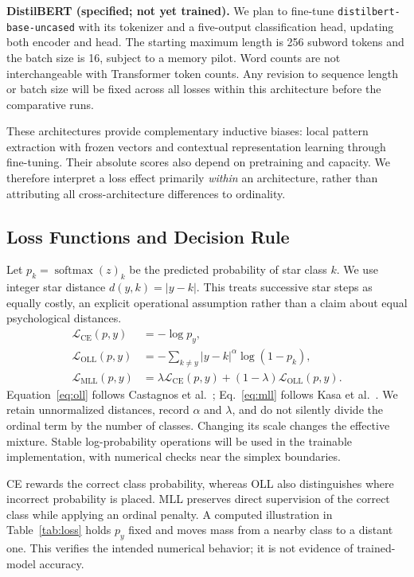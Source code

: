 \documentclass[conference]{IEEEtran}
\newcommand{\CE}{\mathcal{L}_{\mathrm{CE}}}
\newcommand{\OLL}{\mathcal{L}_{\mathrm{OLL}}}
\newcommand{\MLL}{\mathcal{L}_{\mathrm{MLL}}}
\begin{document}
\textbf{DistilBERT (specified; not yet trained).} We plan to fine-tune \texttt{distilbert-base-uncased} with its tokenizer and a five-output classification head, updating both encoder and head. The starting maximum length is 256 subword tokens and the batch size is 16, subject to a memory pilot. Word counts are not interchangeable with Transformer token counts. Any revision to sequence length or batch size will be fixed across all losses within this architecture before the comparative runs.

These architectures provide complementary inductive biases: local pattern extraction with frozen vectors and contextual representation learning through fine-tuning. Their absolute scores also depend on pretraining and capacity. We therefore interpret a loss effect primarily \emph{within} an architecture, rather than attributing all cross-architecture differences to ordinality.

\subsection{Loss Functions and Decision Rule}
Let $p_k=\operatorname{softmax}(z)_k$ be the predicted probability of star class $k$. We use integer star distance $d(y,k)=|y-k|$. This treats successive star steps as equally costly, an explicit operational assumption rather than a claim about equal psychological distances.
\begin{align}
\CE(p,y)&=-\log p_y,\label{eq:ce}\\
\OLL(p,y)&=-\sum_{k\ne y}|y-k|^{\alpha}\log(1-p_k),\label{eq:oll}\\
\MLL(p,y)&=\lambda\CE(p,y)+(1-\lambda)\OLL(p,y).
\label{eq:mll}
\end{align}
Equation~\eqref{eq:oll} follows Castagnos et al.~\cite{oll2022}; Eq.~\eqref{eq:mll} follows Kasa et al.~\cite{mll2024}. We retain unnormalized distances, record $\alpha$ and $\lambda$, and do not silently divide the ordinal term by the number of classes. Changing its scale changes the effective mixture. Stable log-probability operations will be used in the trainable implementation, with numerical checks near the simplex boundaries.

CE rewards the correct class probability, whereas OLL also distinguishes where incorrect probability is placed. MLL preserves direct supervision of the correct class while applying an ordinal penalty. A computed illustration in Table~\ref{tab:loss} holds $p_y$ fixed and moves mass from a nearby class to a distant one. This verifies the intended numerical behavior; it is not evidence of trained-model accuracy.
\end{document}
